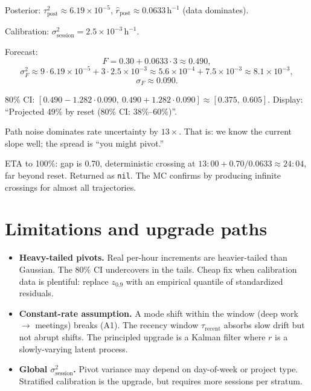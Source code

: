 \documentclass[11pt]{article}
\newcommand{\rpost}{\hat r_{\text{post}}}
\newcommand{\taupostsq}{\tau_{\text{post}}^2}
\newcommand{\sigsessionsq}{\sigma_{\text{session}}^2}
\newcommand{\taurecent}{\tau_{\text{recent}}}
\begin{document}
Posterior: $\taupostsq \approx 6.19 \times 10^{-5}$, $\rpost \approx
0.0633\,\mathrm{h}^{-1}$ (data dominates).

Calibration: $\sigsessionsq = 2.5 \times 10^{-3}\,\mathrm{h}^{-1}$.

Forecast:
\[
  F = 0.30 + 0.0633 \cdot 3 \approx 0.490,
\]
\[
  \sigma_F^2 \approx 9 \cdot 6.19 \times 10^{-5}
    + 3 \cdot 2.5 \times 10^{-3}
    \approx 5.6 \times 10^{-4} + 7.5 \times 10^{-3}
    \approx 8.1 \times 10^{-3},
\]
\[
  \sigma_F \approx 0.090.
\]

80\% CI: $[0.490 - 1.282 \cdot 0.090,\ 0.490 + 1.282 \cdot 0.090]
\approx [0.375,\ 0.605]$. Display: ``Projected 49\% by reset (80\% CI:
38\%--60\%)''.

Path noise dominates rate uncertainty by $13\times$. That is: we know the
current slope well; the spread is ``you might pivot.''

ETA to 100\%: gap is 0.70, deterministic crossing at $13{:}00 +
0.70/0.0633 \approx 24{:}04$, far beyond reset. Returned as \texttt{nil}.
The MC confirms by producing infinite crossings for almost all
trajectories.

\section{Limitations and upgrade paths}

\begin{itemize}
  \item \textbf{Heavy-tailed pivots.} Real per-hour increments are
    heavier-tailed than Gaussian. The 80\% CI undercovers in the tails.
    Cheap fix when calibration data is plentiful: replace $z_{0.9}$ with an
    empirical quantile of standardized residuals.
  \item \textbf{Constant-rate assumption.} A mode shift within the window
    (deep work $\to$ meetings) breaks (A1). The recency window $\taurecent$
    absorbs slow drift but not abrupt shifts. The principled upgrade is a
    Kalman filter where $r$ is a slowly-varying latent process.
  \item \textbf{Global $\sigsessionsq$.} Pivot variance may depend on
    day-of-week or project type. Stratified calibration is the upgrade, but
    requires more sessions per stratum.
\end{itemize}
\end{document}
